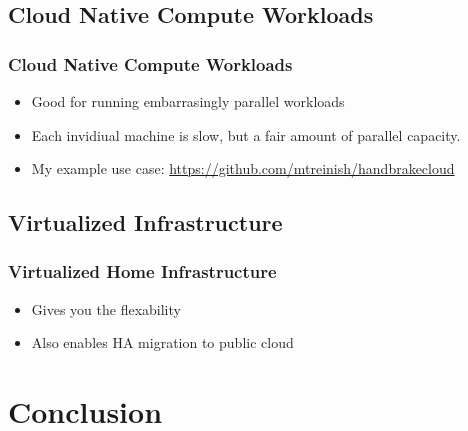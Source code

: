 \documentclass[aspectratio=169,11pt,hyperref={colorlinks=true}]{beamer}
\begin{document}
\subsection{Cloud Native Compute Workloads}
\begin{frame}
        \frametitle{Cloud Native Compute Workloads}
        \begin{itemize}
        \item Good for running embarrasingly parallel workloads
        \item Each invidiual machine is slow, but a fair amount of
            parallel capacity.
        \item My example use case: \href{https://github.com/mtreinish/handbrakecloud}{https://github.com/mtreinish/handbrakecloud}
    \end{itemize}
\end{frame}

\subsection{Virtualized Infrastructure}
\begin{frame}
    \frametitle{Virtualized Home Infrastructure}
    \begin{itemize}
        \item Gives you the flexability
        \item Also enables HA migration to public cloud
    \end{itemize}
\end{frame}


\section{Conclusion}
\end{document}
